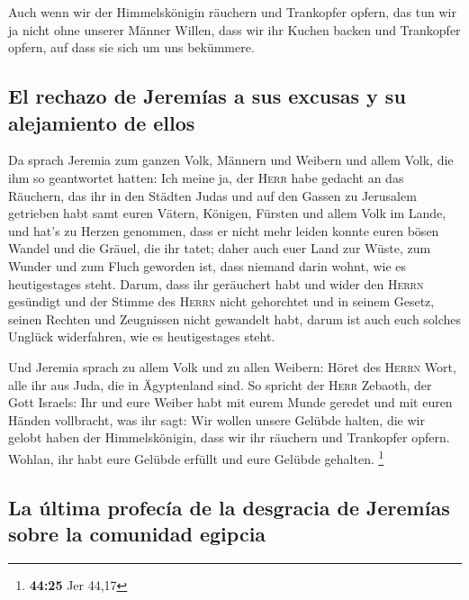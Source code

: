  Auch wenn wir der Himmelskönigin räuchern und Trankopfer
opfern, das tun wir ja nicht ohne unserer Männer Willen, dass wir ihr
Kuchen backen und Trankopfer opfern, auf dass sie sich um uns bekümmere.

\hypertarget{el-rechazo-de-jeremuxedas-a-sus-excusas-y-su-alejamiento-de-ellos}{%
\subsection{El rechazo de Jeremías a sus excusas y su alejamiento de
ellos}\label{el-rechazo-de-jeremuxedas-a-sus-excusas-y-su-alejamiento-de-ellos}}

 Da sprach Jeremia zum ganzen Volk, Männern und Weibern
und allem Volk, die ihm so geantwortet hatten:  Ich meine
ja, der \textsc{Herr} habe gedacht an das Räuchern, das ihr in den
Städten Judas und auf den Gassen zu Jerusalem getrieben habt samt euren
Vätern, Königen, Fürsten und allem Volk im Lande, und hat's zu Herzen
genommen,  dass er nicht mehr leiden konnte euren bösen
Wandel und die Gräuel, die ihr tatet; daher auch euer Land zur Wüste,
zum Wunder und zum Fluch geworden ist, dass niemand darin wohnt, wie es
heutigestages steht.  Darum, dass ihr geräuchert habt und
wider den \textsc{Herrn} gesündigt und der Stimme des \textsc{Herrn}
nicht gehorchtet und in seinem Gesetz, seinen Rechten und Zeugnissen
nicht gewandelt habt, darum ist auch euch solches Unglück widerfahren,
wie es heutigestages steht.

 Und Jeremia sprach zu allem Volk und zu allen Weibern:
Höret des \textsc{Herrn} Wort, alle ihr aus Juda, die in Ägyptenland
sind.  So spricht der \textsc{Herr} Zebaoth, der Gott
Israels: Ihr und eure Weiber habt mit eurem Munde geredet und mit euren
Händen vollbracht, was ihr sagt: Wir wollen unsere Gelübde halten, die
wir gelobt haben der Himmelskönigin, dass wir ihr räuchern und
Trankopfer opfern. Wohlan, ihr habt eure Gelübde erfüllt und eure
Gelübde gehalten. \footnote{\textbf{44:25} Jer 44,17}

\hypertarget{la-uxfaltima-profecuxeda-de-la-desgracia-de-jeremuxedas-sobre-la-comunidad-egipcia}{%
\subsection{La última profecía de la desgracia de Jeremías sobre la
comunidad
egipcia}\label{la-uxfaltima-profecuxeda-de-la-desgracia-de-jeremuxedas-sobre-la-comunidad-egipcia}}

